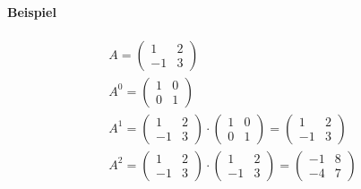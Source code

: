 \documentclass[11pt]{report}
\begin{document}
\paragraph{Beispiel}
\begin{align}
 A = \begin{pmatrix} 1 & 2 \\ -1 & 3 \end{pmatrix} \\
 A^0 = \begin{pmatrix} 1 & 0 \\ 0 & 1 \end{pmatrix} \\
 A^1 = \begin{pmatrix} 1 & 2\\ -1 & 3\end{pmatrix}\cdot \begin{pmatrix} 1 & 0 \\ 0 & 1 \end{pmatrix} = \begin{pmatrix} 1 & 2\\ -1 & 3\end{pmatrix} \\
 A^2 = \begin{pmatrix} 1 & 2\\ -1 & 3\end{pmatrix}\cdot \begin{pmatrix} 1 & 2\\ -1 & 3\end{pmatrix} = \begin{pmatrix} -1 & 8 \\ -4 & 7\end{pmatrix}
\end{align}
\end{document}
